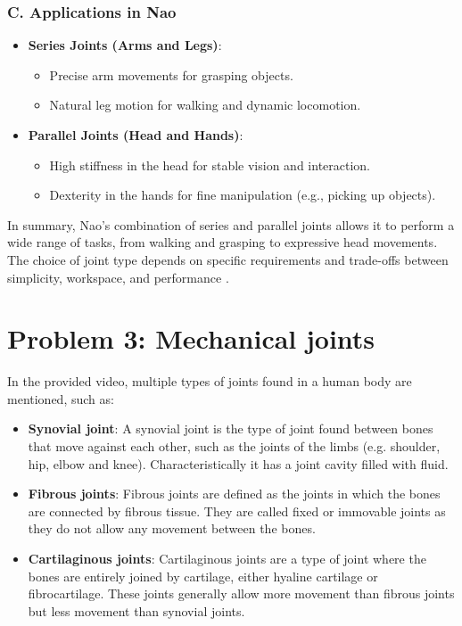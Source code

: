 \documentclass[conference]{IEEEtran}
\begin{document}
\subsubsection*{C. Applications in Nao}
\begin{itemize}
    \item \textbf{Series Joints (Arms and Legs)}:
        \begin{itemize}
            \item Precise arm movements for grasping objects.
            \item Natural leg motion for walking and dynamic locomotion.
        \end{itemize}
    \item \textbf{Parallel Joints (Head and Hands)}:
        \begin{itemize}
            \item High stiffness in the head for stable vision and interaction.
            \item Dexterity in the hands for fine manipulation (e.g., picking up objects).
        \end{itemize}
\end{itemize}

In summary, Nao's combination of series and parallel joints allows it to perform a wide range of tasks, from walking and grasping to expressive head movements. The choice of joint type depends on specific requirements and trade-offs between simplicity, workspace, and performance \cite{b10}.

\section{Problem 3: Mechanical joints}
In the provided video, multiple types of joints found in a human body are mentioned, such as:
\begin{itemize}
    \item \textbf{Synovial joint}: A synovial joint is the type of joint found between bones that move against each other, such as the joints of the limbs (e.g. shoulder, hip, elbow and knee). Characteristically it has a joint cavity filled with fluid.
    \item \textbf{Fibrous joints}: Fibrous joints are defined as the joints in which the bones are connected by fibrous tissue. They are called fixed or immovable joints as they do not allow any movement between the bones.
    \item \textbf{Cartilaginous joints}: Cartilaginous joints are a type of joint where the bones are entirely joined by cartilage, either hyaline cartilage or fibrocartilage. These joints generally allow more movement than fibrous joints but less movement than synovial joints.
\end{itemize}
\end{document}
